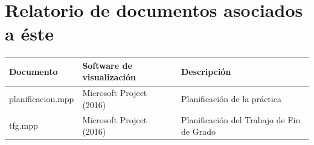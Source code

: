 \documentclass[10pt,a4paper]{article}
\begin{document}
		\section{Relatorio de documentos asociados a éste}
		\begin{table}[htb]
        \centering
        \begin{tabular}{|l|l|l|}
        \hline
        \textbf{Documento} & \textbf{Software de visualización} & \textbf{Descripción} \\
        \hline
        planificacion.mpp & Microsoft Project (2016) & Planificación de la práctica \\ 
        \hline
        tfg.mpp & Microsoft Project (2016) & Planificación del Trabajo de Fin de Grado \\ 
        \hline
        \end{tabular}   
        \end{table}
        
\end{document}
